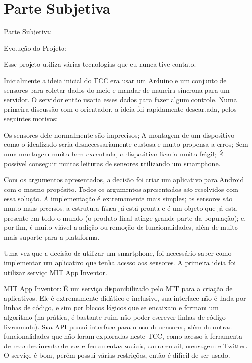\documentclass[a4paper,12pt]{article}
\begin{document}
\section{Parte Subjetiva}

Parte Subjetiva:




Evolução do Projeto:


Esse projeto utiliza várias tecnologias que eu nunca tive contato.


Inicialmente a ideia inicial do TCC era usar um Arduino e um conjunto de sensores para coletar dados do meio e mandar de maneira síncrona para um servidor. O servidor então usaria esses dados para fazer algum controle. Numa primeira discussão com o orientador, a ideia foi rapidamente descartada, pelos seguintes motivos:

Os sensores dele normalmente são imprecisos;
A montagem de um dispositivo como o idealizado seria desnecessariamente custosa e muito propensa a erros;
Sem uma montagem muito bem executada, o dispositivo ficaria muito frágil;
É possível conseguir muitas leituras de sensores utilizando um smartphone.


  Com os argumentos apresentados, a decisão foi criar um aplicativo para Android com o mesmo propósito. Todos os argumentos apresentados são resolvidos com essa solução. A implementação é extremamente mais simples; os sensores são muito mais precisos; a estrutura física já está pronta e é um objeto que já está presente em todo o mundo (o produto final atinge grande parte da população); e, por fim, é muito viável a adição ou remoção de funcionalidades, além de muito mais suporte para a plataforma.


  Uma vez que a decisão de utilizar um smartphone, foi necessário saber como implementar um aplicativo que tenha acesso aos sensores.
  A primeira ideia foi utilizar serviço MIT App Inventor.


MIT App Inventor:
  É um serviço disponibilizado pelo MIT para a criação de aplicativos. Ele é extremamente didático e inclusivo, sua interface não é dada por linhas de código, e sim por blocos lógicos que se encaixam e formam um algoritmo (na prática, é bastante ruim não poder escrever linhas de código livremente). Sua API possui interface para o uso de sensores, além de outras funcionalidades que não foram exploradas neste TCC, como acesso à ferramenta de reconhecimento de voz e ferramentas sociais, como email, mensagem e Twitter. O serviço é bom, porém possui várias restrições, então é difícil de ser usado.
\end{document}
